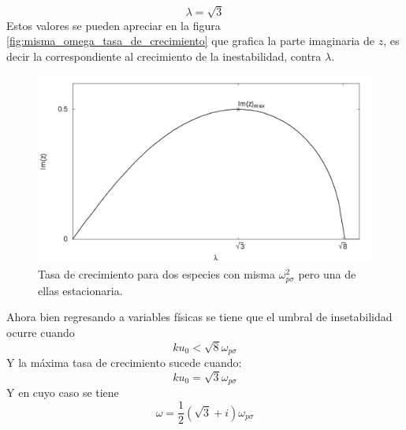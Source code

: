 \documentclass[../tesis_main_file.tex]{subfiles}
\begin{document}
\begin{equation}
\lambda = \sqrt{3}
\end{equation}
Estos valores se pueden apreciar en la figura \ref{fig:misma_omega_tasa_de_crecimiento} que grafica la parte imaginaria de $z$, es decir la correspondiente al crecimiento de la inestabilidad, contra $\lambda$. 
\begin{figure}[!h]
\includegraphics[height=0.3\paperheight]{grafica_misma_omega_reposo.png}
\caption{Tasa de crecimiento para dos especies con misma $\omega_{p\sigma}^2$ pero una de ellas estacionaria.}
\label{fig:misma_omega_reposo}
\end{figure}
Ahora bien regresando a variables físicas se tiene que el umbral de insetabilidad ocurre cuando
\begin{equation}
ku_0 < \sqrt{8} \omega_{p\sigma}
\end{equation}
Y la máxima tasa de crecimiento sucede cuando:
\begin{equation}
ku_0= \sqrt{3} \omega_{p\sigma}
\end{equation}
Y en cuyo caso se tiene
\begin{equation}
\omega = \frac{1}{2} (\sqrt{3} + i)\omega_{p\sigma}
\end{equation}
\end{document}
